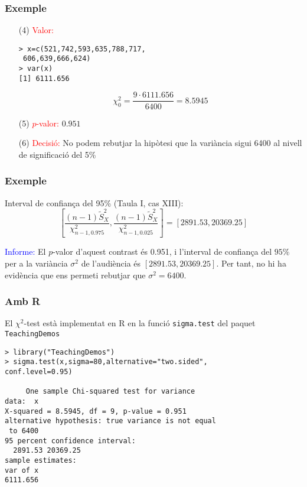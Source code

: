 \documentclass[12pt,t]{beamer}\usepackage[]{graphicx}\usepackage[]{color}
\newcommand{\red}[1]{\textcolor{red}{#1}}
\newcommand{\blue}[1]{\textcolor{blue}{#1}}
\renewcommand{\emph}[1]{{\color{red}#1}}
\theoremstyle{plain}
\theoremstyle{definition}
\begin{document}
\begin{frame}[fragile]
\frametitle{Exemple}
\begin{itemize}

\item[(4)] \red{Valor:}
\begin{verbatim}
> x=c(521,742,593,635,788,717,
 606,639,666,624)
> var(x)
[1] 6111.656
\end{verbatim}
$$
\chi_0^2=\frac{9\cdot 6111.656}{6400}=8.5945
$$


\item[(5)] \red{$p$-valor:} $0.951$

\item[(6)] \red{Decisió:} No podem rebutjar la hipòtesi que la variància sigui 6400 al nivell
de significació del 5\%
\end{itemize}
\end{frame}



\begin{frame}
\frametitle{Exemple}

\emph{Interval de confiança del 95\%} (Taula I, cas XIII):
$$
\left[ \frac{(n-1)\widetilde{S}_{X}^2}{\chi_{n-1,0.975}^2},
\frac{(n-1)\widetilde{S}_{X}^2}{\chi_{n-1,0.025}^2}
\right]=[2891.53,20369.25]
$$
\bigskip


\blue{Informe:} El $p$-valor d'aquest contrast és 0.951, i l'interval de confiança del $95\%$ per a la variància $\sigma^2$ de l'audiència és $[2891.53,20369.25]$. Per tant,  no hi ha evidència que ens permeti rebutjar que $\sigma^2=6400$.

\end{frame}


\begin{frame}[fragile]
\frametitle{Amb R}

El $\chi^2$-test està implementat en R en la funció \texttt{sigma.test} del paquet \texttt{TeachingDemos}

{\small
\begin{verbatim}
> library("TeachingDemos")
> sigma.test(x,sigma=80,alternative="two.sided",
conf.level=0.95)

     One sample Chi-squared test for variance
data:  x
X-squared = 8.5945, df = 9, p-value = 0.951
alternative hypothesis: true variance is not equal
 to 6400
95 percent confidence interval:
  2891.53 20369.25
sample estimates:
var of x 
6111.656 
\end{verbatim}
}
\end{frame}
\end{document}
